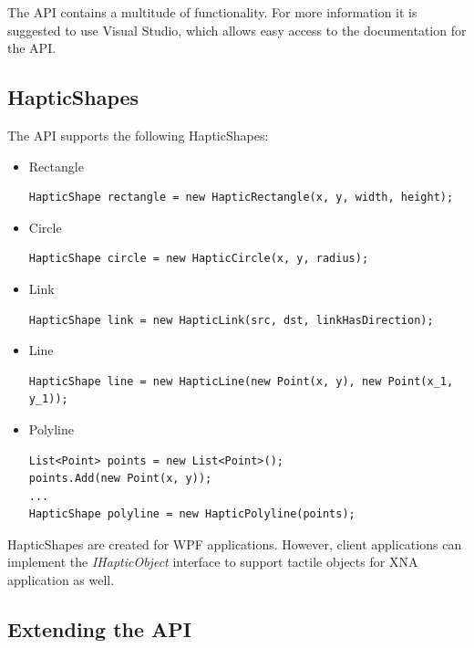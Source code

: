 \documentclass[a4paper]{article}
\begin{document}
The API contains a multitude of functionality. For more information it is suggested to use Visual Studio, which allows easy access to the documentation for the API. 

\subsection{HapticShapes}

The API supports the following HapticShapes:

\begin{itemize}
\item Rectangle
\lstset{style=sharpc1}
\begin{lstlisting}
HapticShape rectangle = new HapticRectangle(x, y, width, height);
\end{lstlisting}

\item Circle
\lstset{style=sharpc1}
\begin{lstlisting}
HapticShape circle = new HapticCircle(x, y, radius);
\end{lstlisting}

\item Link
\lstset{style=sharpc1}
\begin{lstlisting}
HapticShape link = new HapticLink(src, dst, linkHasDirection);
\end{lstlisting}

\item Line
\lstset{style=sharpc1}
\begin{lstlisting}
HapticShape line = new HapticLine(new Point(x, y), new Point(x_1, y_1));
\end{lstlisting}

\item Polyline
\lstset{style=sharpc1}
\begin{lstlisting}
List<Point> points = new List<Point>();
points.Add(new Point(x, y));
...
HapticShape polyline = new HapticPolyline(points);
\end{lstlisting}

\end{itemize}

HapticShapes are created for WPF applications. However, client applications can implement the \textit{IHapticObject} interface to support tactile objects for XNA application as well.

\subsection{Extending the API}
\end{document}
